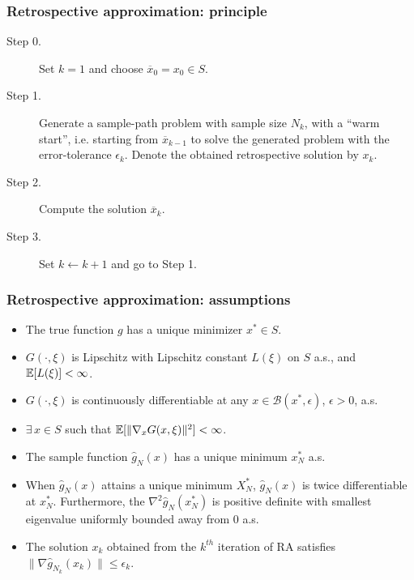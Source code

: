 \documentclass{beamer}
\def\cB{\mathcal{B}}
\begin{document}
\begin{frame}
\frametitle{Retrospective approximation: principle}

\begin{description}
\item[Step 0.]
Set $k = 1$ and choose $\overline{x}_0 = x_0 \in S$.
\item[Step 1.]
Generate a sample-path problem with sample size $N_k$, with a ``warm start'', i.e. starting from $\overline{x}_{k-1}$ %
to solve the generated problem with the error-tolerance $\epsilon_k$.
Denote the obtained retrospective solution by $x_k$.
\item[Step 2.]
Compute the solution $\overline{x}_k$.
\item[Step 3.]
Set $k \leftarrow k + 1$ and go to Step 1.
\end{description}

\end{frame}

\begin{frame}
\frametitle{Retrospective approximation: assumptions}

\begin{itemize}
\item
The true function $g$ has a unique minimizer $x^* \in S$.
\item
$G(\cdot,\xi)$ is Lipschitz with Lipschitz constant $L(\xi)$ on $S$ a.s., and ${\mathbb{E}}[L(\xi)] < \infty$.
\item
$G(\cdot,\xi)$ is continuously differentiable at any $x \in \cB(x^*, \epsilon)$, $\epsilon > 0$, a.s.
\item
$\exists\, x \in S$ such that ${\mathbb{E}}[\|\nabla_x G(x,\xi)\|^2] < \infty$.
\item
The sample function $\hat{g}_N(x)$ has a unique minimum $x_N^*$ a.s.
\item
When $\hat{g}_N(x)$ attains a unique minimum $X_N^*$, $\hat{g}_N(x)$ is twice differentiable at $x_N^*$.
Furthermore, the $\nabla^2 \hat{g}_N (x_N^*)$ is positive definite with smallest eigenvalue uniformly bounded away from 0 a.s.
\item
The solution $x_k$ obtained from the $k^{th}$ iteration of RA satisfies $\| \nabla \hat{g}_{N_k}(x_k) \| \leq \epsilon_k$.
\end{itemize}

\end{frame}
\end{document}
